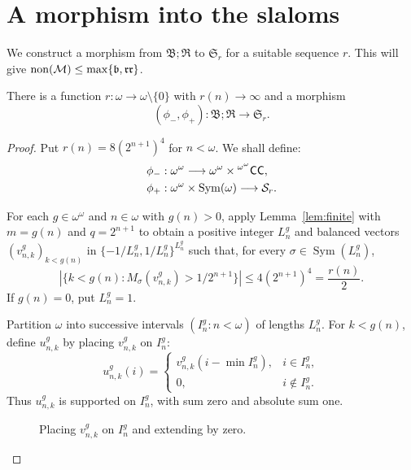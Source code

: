 \section{A morphism into the slaloms}\label{sec:construction}

We construct a morphism from $\mathfrak B;\mathfrak R$ to
$\mathfrak S_r$ for a suitable sequence $r$. This will give
$\operatorname{non}(\mathcal M)\leq\max\{\mathfrak b,\mathfrak{rr}\}$.

\begin{lemma}\label{lem:morphism}
There is a function $r:\omega\to\omega\setminus\{0\}$ with
$r(n)\to\infty$ and a morphism
\[
 (\phi_-,\phi_+):\mathfrak B;\mathfrak R\longrightarrow\mathfrak S_r.
\]
\end{lemma}

\begin{proof}
Put $r(n)=8(2^{n+1})^4$ for $n<\omega$.
We shall define:
\[
\begin{aligned}
 \phi_-&:\omega^\omega\longrightarrow
              \omega^\omega\times{}^{\omega^\omega}\mathsf{CC},\\
 \phi_+&:\omega^\omega\times\operatorname{Sym}(\omega)\longrightarrow\mathcal S_r.
\end{aligned}
\]

For each $g\in\omega^\omega$ and $n\in \omega$ with $g(n)>0$, apply Lemma~\ref{lem:finite}
with $m=g(n)$ and $q=2^{n+1}$ to obtain a positive integer $L_n^g$ and
balanced vectors $(v_{n,k}^g)_{k<g(n)}$ in $\{-1/L_n^g,1/L_n^g\}^{L_n^g}$
such that, for every $\sigma\in\operatorname{Sym}(L_n^g)$,
\begin{equation}\label{eq:finite-block-bound}
 \left|\{k<g(n):M_\sigma(v_{n,k}^g)>1/2^{n+1}\}\right|
 \leq 4(2^{n+1})^4=\frac{r(n)}2.
\end{equation}
If $g(n)=0$, put $L_n^g=1$.

Partition $\omega$ into successive intervals $(I_n^g:n<\omega)$
of lengths $L_n^g$. For $k<g(n)$, define $u_{n,k}^g$ by placing $v_{n,k}^g$ on $I_n^g$:
\[
 u_{n,k}^g(i)=
 \begin{cases}
  v_{n,k}^g(i-\min I_n^g),&i\in I_n^g,\\
  0,&i\notin I_n^g.
 \end{cases}
\]
Thus $u_{n,k}^g$ is supported on $I_n^g$, with sum zero and absolute
sum one.

\begin{figure}[htbp]
\centering
{}
\caption{Placing $v_{n,k}^g$ on $I_n^g$ and extending by zero.}
\label{fig:block-embedding}
\end{figure}


\end{proof}
